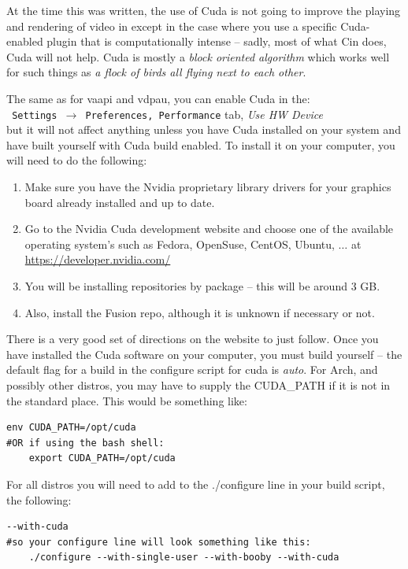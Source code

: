 At the time this was written, the use of Cuda is not going to improve the playing and rendering of video in \CGG{} except in the case where you use a specific Cuda-enabled plugin that is computationally intense -- sadly, most of what Cin does, Cuda will not help.  Cuda is mostly a \textit{block oriented algorithm} which works well for such things as \textit{a flock of birds all flying next to each other}.

The same as for vaapi and vdpau, you can enable Cuda in the:\\
\texttt{ Settings $\rightarrow$ Preferences, Performance} tab, \textit{Use HW Device}\\
but it will not affect anything unless you have Cuda installed on your system and have built \CGG{} yourself with Cuda build enabled.  To install it on your computer, you will need to do the following:

\begin{enumerate}
	\item Make sure you have the Nvidia proprietary library drivers for your graphics board already installed and up to date.
	\item Go to the Nvidia Cuda development website and choose one of the available operating system’s
	such as Fedora, OpenSuse, CentOS, Ubuntu, $\dots$ at   {\small \url{https://developer.nvidia.com/}}
	\item You will be installing repositories by package -- this will be around 3 GB.
	\item Also, install the Fusion repo, although it is unknown if necessary or not.
\end{enumerate}

There is a very good set of directions on the website to just follow.  Once you have installed the Cuda software on your computer, you must build \CGG{} yourself -- the default flag for a build in the configure script for cuda is \textit{auto}.  For Arch, and possibly other distros, you may have to supply the CUDA\_PATH if it is not in the standard place.  This would be
something like:


\begin{lstlisting}[numbers=none]
	env CUDA_PATH=/opt/cuda
#OR if using the bash shell: 
	export CUDA_PATH=/opt/cuda
\end{lstlisting}
For all distros you will need to add to the ./configure line in your build script, the following:


\begin{lstlisting}[numbers=none]
	--with-cuda
#so your configure line will look something like this:
	./configure --with-single-user --with-booby --with-cuda
\end{lstlisting}

